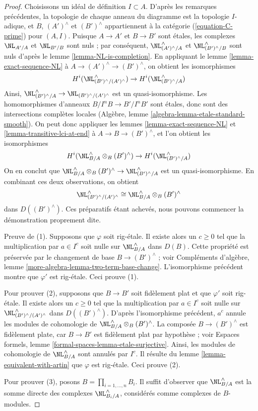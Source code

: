 \begin{proof}
\medskip\noindent
Choisissons un idéal de définition $I \subset A$. D'après les remarques précédentes,
la topologie de chaque anneau du diagramme est la topologie $I$-adique,
et $B$, $(A')^\wedge$ et $(B')^\wedge$ appartiennent à la catégorie
(\ref{equation-C-prime}) pour $(A, I)$.
Puisque $A \to A'$ et $B \to B'$ sont étales, les complexes
$\NL_{A'/A}$ et $\NL_{B'/B}$ sont nuls ; par conséquent,
$\NL_{(A')^\wedge/A}^\wedge$ et $\NL_{(B')^\wedge/B}^\wedge$
sont nuls d'après le lemme \ref{lemma-NL-is-completion}.
En appliquant le lemme \ref{lemma-exact-sequence-NL} à
$A \to (A')^\wedge \to (B')^\wedge$, on obtient les isomorphismes
$$
H^i(\NL_{(B')^\wedge/(A')^\wedge}^\wedge) \to H^i(\NL_{(B')^\wedge/A}^\wedge)
$$
Ainsi, $\NL_{(B')^\wedge/A}^\wedge \to \NL_{(B')^\wedge/(A')^\wedge}$
est un quasi-isomorphisme. Les homomorphismes d'anneaux $B/I^nB \to B'/I^nB'$ sont étales,
donc sont des intersections complètes locales
(Algèbre, lemme \ref{algebra-lemma-etale-standard-smooth}).
On peut donc appliquer les
lemmes \ref{lemma-exact-sequence-NL} et
\ref{lemma-transitive-lci-at-end} à
$A \to B \to (B')^\wedge$, et l'on obtient les isomorphismes
$$
H^i(\NL_{B/A}^\wedge \otimes_B (B')^\wedge) \to
H^i(\NL_{(B')^\wedge/A}^\wedge)
$$
On en conclut que
$\NL_{B/A}^\wedge \otimes_B (B')^\wedge \to \NL_{(B')^\wedge/A}^\wedge$
est un quasi-isomorphisme. En combinant ces deux observations, on obtient
$$
\NL_{(B')^\wedge/(A')^\wedge}^\wedge \cong
\NL_{B/A}^\wedge \otimes_B (B')^\wedge
$$
dans $D((B')^\wedge)$.
Ces préparatifs étant achevés, nous pouvons commencer la démonstration proprement dite.

\medskip\noindent
Preuve de (1). Supposons que $\varphi$ soit rig-étale. Il existe alors un $c \geq 0$
tel que la multiplication par $a \in I^c$ soit nulle sur $\NL_{B/A}^\wedge$
dans $D(B)$. Cette propriété est préservée par le changement de base
$B \to (B')^\wedge$ ; voir
Compléments d'algèbre, lemme \ref{more-algebra-lemma-two-term-base-change}.
L'isomorphisme précédent montre que $\varphi'$ est rig-étale.
Ceci prouve (1).

\medskip\noindent
Pour prouver (2), supposons que $B \to B'$ soit fidèlement plat et que $\varphi'$
soit rig-étale. Il existe alors un $c \geq 0$ tel que
la multiplication par $a \in I^c$ soit nulle sur
$\NL_{(B')^\wedge/(A')^\wedge}^\wedge$ dans $D((B')^\wedge)$.
D'après l'isomorphisme précédent, $a^c$ annule les
modules de cohomologie de
$\NL_{B/A}^\wedge \otimes_B (B')^\wedge$.
La composée $B \to (B')^\wedge$ est fidèlement plate,
car $B \to B'$ est fidèlement plat par hypothèse ; voir
Espaces formels, lemme \ref{formal-spaces-lemma-etale-surjective}.
Ainsi, les modules de cohomologie de $\NL_{B/A}^\wedge$ sont annulés
par $I^c$. Il résulte du lemme \ref{lemma-equivalent-with-artin}
que $\varphi$ est rig-étale.
Ceci prouve (2).

\medskip\noindent
Pour prouver (3), posons $B = \prod_{i = 1, \ldots, n} B_i$.
Il suffit d'observer que $\NL_{B/A}^\wedge$ est la somme
directe des complexes $\NL_{B_i/A}^\wedge$, considérés comme complexes
de $B$-modules.
\end{proof}

